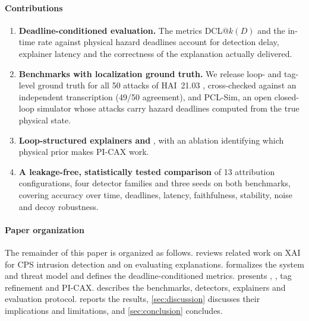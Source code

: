 \paragraph{Contributions}
\begin{enumerate}
\item \textbf{Deadline-conditioned evaluation.} The metrics DCL@$k(D)$ and the in-time rate against physical hazard deadlines account for detection delay, explainer latency and the correctness of the explanation actually delivered.
\item \textbf{Benchmarks with localization ground truth.} We release loop- and tag-level ground truth for all 50 attacks of HAI~21.03 \citep{shin2021hai}, cross-checked against an independent transcription (49/50 agreement), and PCL-Sim, an open closed-loop simulator whose \SimNattacks{} attacks carry hazard deadlines computed from the true physical state.
\item \textbf{Loop-structured explainers and \TEA}, with an ablation identifying which physical prior makes PI-CAX work.
\item \textbf{A leakage-free, statistically tested comparison} of 13 attribution configurations, four detector families and three seeds on both benchmarks, covering accuracy over time, deadlines, latency, faithfulness, stability, noise and decoy robustness.
\end{enumerate}

\paragraph{Paper organization} The remainder of this paper is organized as follows.  reviews related work on XAI for CPS intrusion detection and on evaluating explanations.  formalizes the system and threat model and defines the deadline-conditioned metrics.  presents \LX, \TEA, tag refinement and PI-CAX.  describes the benchmarks, detectors, explainers and evaluation protocol.  reports the results, \cref{sec:discussion} discusses their implications and limitations, and \cref{sec:conclusion} concludes.
